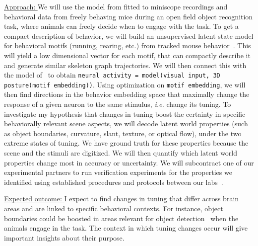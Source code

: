 \documentclass[COG,11pt]{ercgrant}
\begin{document}
\underline{Approach: } 
We will use the model from  fitted to miniscope recordings and behavioral data from freely behaving mice during an open field object recognition task, where animals can freely decide when to engage with the task.
To get a compact description of behavior, we will build an unsupervised latent state model for behavioral motifs (running, rearing, etc.) from tracked mouse behavior~\parencite[similar to][]{Wiltschko2015-ey, Wiltschko2020-zd}.
This will yield a low dimensional vector for each motif, that can compactly describe it and generate similar skeleton graph trajectories. 
We will then connect this with the model of~ to obtain \texttt{neural activity = model(visual input, 3D posture(motif embedding))}. 
Using optimization on \texttt{motif embedding}, we will then find directions in the behavior embedding space that maximally change the response of a given neuron to the same stimulus, \textit{i.e.} change its tuning.
To investigate my hypothesis that changes in tuning boost the certainty in specific behaviorally relevant scene aspects, we will decode latent world properties (such as object boundaries, curvature, slant, texture, or optical flow), under the two extreme states of tuning. 
We have ground truth for these properties because the scene and the stimuli are digitized.
We will then quantify which latent world properties change most in accuracy or uncertainty.
We will subcontract one of our experimental partners to run verification experiments for the properties we identified using established procedures and protocols between our labs~\parencite[used in \textit{e.g.}][]{Walker2019-yw, Franke2022-do}.

\underline{Expected outcome: } I expect to find changes in tuning that differ across brain areas and are linked to specific behavioral contexts. 
For instance, object boundaries could be boosted in areas relevant for object detection~\parencite{Froudarakis2019-yt} when the animals engage in the task.
The context in which tuning changes occur will give important insights about their purpose.
\end{document}

